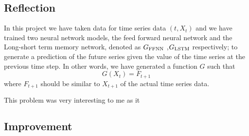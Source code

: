 \documentclass[10pt,a4paper]{article}
\begin{document}
\subsection{Reflection}
%
In this project we have taken data for time series data $(t,X_t)$ and we have trained two neural network models, the feed forward neural network and the Long-short term memory network, denoted as $G_{\rm FFNN}$ ,$G_{\rm LSTM}$ respectively; to generate a prediction of the future series given the value of the time series at the previous time step. In other words, we have generated a function $G$ such that
\begin{equation}
G(X_{t}) = F_{t+1}
\end{equation}
where $F_{t+1}$ should be similar to $X_{t+1}$ of the actual time series data. 

This problem was very interesting to me as it 
 

\subsection{Improvement}
%
\end{document}
